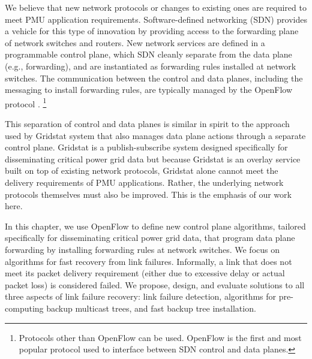 We believe that new network protocols or changes to existing ones are required to meet PMU application requirements. Software-defined networking (SDN) provides a vehicle for this type of innovation 
by providing access to the forwarding plane of network switches and routers. %
New network services are defined in a programmable control plane, which SDN cleanly separate from the data plane (e.g., forwarding), and are instantiated as forwarding rules installed
at network switches.  %
The communication between the control and data planes, including the messaging to install forwarding rules, are typically managed by the OpenFlow protocol \cite{OpenFlow08}.
\footnote{Protocols other than OpenFlow can be used.  OpenFlow is the first and most popular protocol used to interface between SDN control and data planes.  }

This separation of control and data planes is similar in spirit to the approach used by Gridstat system \cite{Bakken11} that also manages data plane actions through a separate control plane. 
Gridstat is a publish-subscribe system designed specifically for disseminating critical power grid data but because
Gridstat is an overlay service built on top of existing network protocols, Gridstat alone cannot meet the delivery requirements of PMU applications. 
Rather, the underlying network protocols themselves must also be improved. %
This is the emphasis of our work here. 

In this chapter, we use OpenFlow to define new control plane algorithms, tailored specifically for disseminating critical power grid data, that program data plane forwarding by installing
forwarding rules at network switches. %
We focus on algorithms for fast recovery from link failures.
Informally, a link that does not meet its packet delivery requirement (either due to excessive delay or actual packet loss) is considered failed. 
We propose, design, and evaluate solutions to all three aspects of link failure recovery: link failure detection, algorithms for pre-computing backup multicast trees, 
and fast backup tree installation. 





